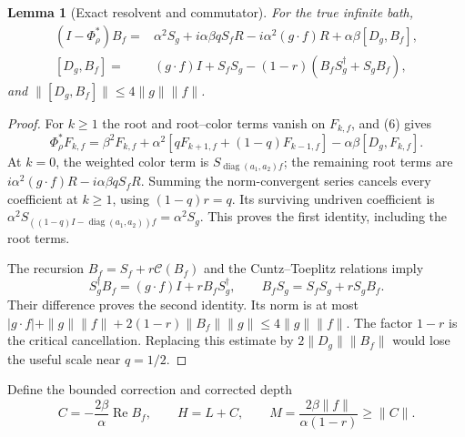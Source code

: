 \documentclass[11pt]{article}
\newtheorem{lemma}[theorem]{Lemma}
\newcommand{\Reop}{\operatorname{Re}}
\begin{document}
\begin{lemma}[Exact resolvent and commutator]
\label{lem:resolvent}
For the true infinite bath,
\[
\begin{split}
 (I-\Phi_\rho^*)B_f
   ={}&\alpha^2S_g+i\alpha\beta qS_fR
           -i\alpha^2(g\cdot f)R
           +\alpha\beta[D_g,B_f],\\
 [D_g,B_f]
   ={}&(g\cdot f)I+S_fS_g
           -(1-r)(B_fS_g^\dagger+S_gB_f),
\end{split}
 \tag{9}
\]
and $\|[D_g,B_f]\|\le4\|g\|\|f\|$.
\end{lemma}
\begin{proof}
For $k\ge1$ the root and root--color terms vanish on $F_{k,f}$, and (6) gives
\[
 \Phi_\rho^*F_{k,f}
 =\beta^2F_{k,f}+\alpha^2
       [qF_{k+1,f}+(1-q)F_{k-1,f}]
       -\alpha\beta[D_g,F_{k,f}].
\]
At $k=0$, the weighted color term is $S_{\operatorname{diag}(a_1,a_2)f}$;
the remaining root terms are
$i\alpha^2(g\cdot f)R-i\alpha\beta qS_fR$.
Summing the norm-convergent series cancels every coefficient at $k\ge1$,
using $(1-q)r=q$. Its surviving undriven coefficient is
$\alpha^2S_{((1-q)I-\operatorname{diag}(a_1,a_2))f}=\alpha^2S_g$.
This proves the first identity, including the root terms.

The recursion $B_f=S_f+r\mathcal C(B_f)$ and the Cuntz--Toeplitz
relations imply
\[
 S_g^\dagger B_f=(g\cdot f)I+rB_fS_g^\dagger,
 \qquad B_fS_g=S_fS_g+rS_gB_f.
\]
Their difference proves the second identity. Its norm is at most
$|g\cdot f|+\|g\|\|f\|+
2(1-r)\|B_f\|\|g\|\le4\|g\|\|f\|$.
The factor $1-r$ is the critical cancellation. Replacing this estimate by
$2\|D_g\|\|B_f\|$ would lose the useful scale near $q=1/2$.
\end{proof}

Define the bounded correction and corrected depth
\[
 C=-\frac{2\beta}{\alpha}\Reop B_f,\qquad
 H=L+C,\qquad
 M=\frac{2\beta\|f\|}{\alpha(1-r)}\ge\|C\|.
 \tag{10}
\]
\end{document}
